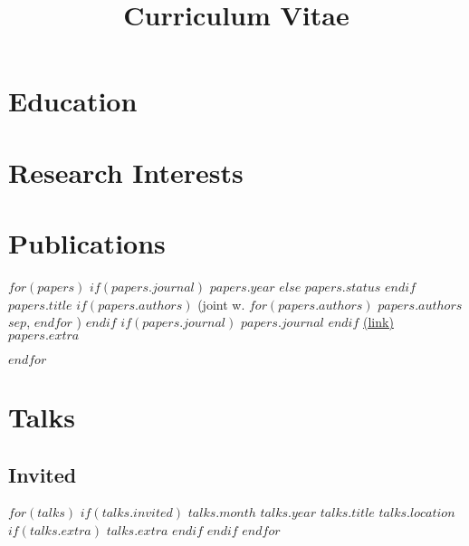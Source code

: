 \documentclass[11pt,letter,sans]{moderncv}        %
\title{Curriculum Vitae}                               %
\begin{document}
\makecvtitle


\section{Education}


\section{Research Interests}


\section{Publications}


$for(papers)$
\cventry
{
  $if(papers.journal)$
    $papers.year$
  $else$
    $papers.status$
  $endif$
}
{$papers.title$}
{%
$if(papers.authors)$%
  (joint w. $for(papers.authors)$%
    $papers.authors$$sep$,%
  $endfor$%
  )%
$endif$%
}
{%
$if(papers.journal)$%
  $papers.journal$%
$endif$%
}
{\href{$papers.link$}{(link)}}
{$papers.extra$}

$endfor$


\section{Talks}

\subsection{Invited}

$for(talks)$
$if(talks.invited)$
  \cventry
  {
  $talks.month$ $talks.year$
  }
  {$talks.title$}
  {$talks.location$}
  {}
  {}
  {%
  $if(talks.extra)$%
    $talks.extra$%
  $endif$%
  }
$endif$
$endfor$
\end{document}
